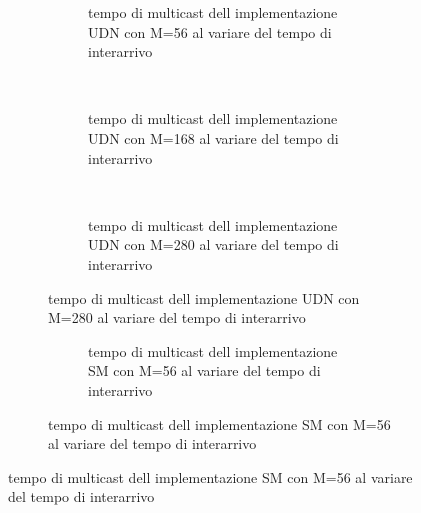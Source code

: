 \begin{figure}[p]
  \caption{Grafici del tempo di multicast al variare del tempo di interarrivo}
  \begin{subfigure}[b]{.5\columnwidth}
    \centering
    \renewcommand\thesubfigure{\alph{subfigure}}
    \caption{Implementazione con solo UDN}
    \begin{subfigure}[b]{\textwidth}
      \centering
      \addtocounter{subfigure}{-1}
      \renewcommand\thesubfigure{\alph{subfigure}1}
      \resizebox{\columnwidth}{!}{}
      \caption{tempo di multicast dell implementazione UDN con M=56 al variare del tempo di interarrivo}
      \label{fig:scalability_UDN_size56}
    \end{subfigure}
    ~
    \begin{subfigure}[b]{\textwidth}
      \centering
      \addtocounter{subfigure}{-1}
      \renewcommand\thesubfigure{\alph{subfigure}2}
      \resizebox{\columnwidth}{!}{}
      \caption{tempo di multicast dell implementazione UDN con M=168 al variare del tempo di interarrivo}
      \label{fig:scalability_UDN_size168}
    \end{subfigure}
    ~
    \begin{subfigure}[b]{\textwidth}
      \centering
      \addtocounter{subfigure}{-1}
      \renewcommand\thesubfigure{\alph{subfigure}3}
      \resizebox{\columnwidth}{!}{}
      \caption{tempo di multicast dell implementazione UDN con M=280 al variare del tempo di interarrivo}
      \label{fig:scalability_UDN_size280}
    \end{subfigure}
    \label{fig:allScalbility_UDN}
  \end{subfigure}
  \hspace{2ex}
  \begin{subfigure}[b]{.5\columnwidth}
    \centering
    \renewcommand\thesubfigure{\alph{subfigure}}
    \caption{Implementazione con solo SM}
    \begin{subfigure}[b]{\textwidth}
      \centering
      \addtocounter{subfigure}{-1}
      \renewcommand\thesubfigure{\alph{subfigure}1}
      \resizebox{\columnwidth}{!}{}
      \caption{tempo di multicast dell implementazione SM con M=56 al variare del tempo di interarrivo}
      \label{fig:scalability_SM_size56}

\end{subfigure}
\end{subfigure}
\end{figure}
